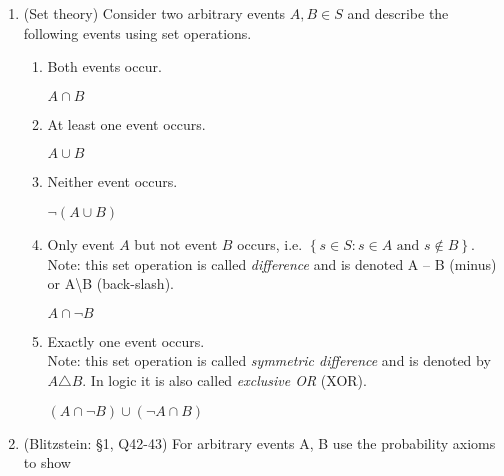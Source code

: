 \documentclass[11pt]{article}
\begin{document}
\begin{enumerate}
		\item (Set theory) Consider two arbitrary events $ A, B \in S $ and describe the following events using set operations.
			\begin{enumerate}
				\item Both events occur.
					\begin{mdframed}
						$ A \cap B $
					\end{mdframed}
				\item At least one event occurs.
					\begin{mdframed}
						$ A \cup B $
					\end{mdframed}
				\item Neither event occurs.
					\begin{mdframed}
						$ \neg \left( A \cup B \right)  $
					\end{mdframed}
				\item Only event $ A $ but not event $ B $ occurs, i.e. $ \left\lbrace s \in S : s \in A \text{ and } s \notin B \right\rbrace $.\\
				Note: this set operation is called \textit{difference} and is denoted A -- B (minus) or A\textbackslash B (back-slash).
					\begin{mdframed}
						$ A \cap \neg B $
					\end{mdframed}
				\item Exactly one event occurs.\\
				Note: this set operation is called \textit{symmetric difference} and is denoted by $ A\triangle B $. In logic it is also called \textit{exclusive OR} (XOR).
				\begin{mdframed}
					$ \left( A \cap \neg B \right) \cup \left( \neg A \cap B \right) $
				\end{mdframed}
			\end{enumerate}

		\item (Blitzstein: \S 1, Q42-43) For arbitrary events A, B use the probability axioms to show
	\end{enumerate}
\end{document}
